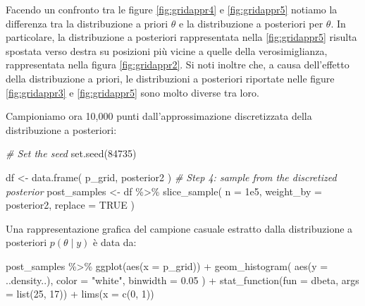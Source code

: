 \documentclass[
]{memoir}
\newenvironment{Shaded}{\begin{snugshade}}{\end{snugshade}}
\newcommand{\AttributeTok}[1]{\textcolor[rgb]{0.77,0.63,0.00}{#1}}
\newcommand{\CommentTok}[1]{\textcolor[rgb]{0.56,0.35,0.01}{\textit{#1}}}
\newcommand{\ConstantTok}[1]{\textcolor[rgb]{0.00,0.00,0.00}{#1}}
\newcommand{\DecValTok}[1]{\textcolor[rgb]{0.00,0.00,0.81}{#1}}
\newcommand{\FloatTok}[1]{\textcolor[rgb]{0.00,0.00,0.81}{#1}}
\newcommand{\FunctionTok}[1]{\textcolor[rgb]{0.00,0.00,0.00}{#1}}
\newcommand{\NormalTok}[1]{#1}
\newcommand{\OtherTok}[1]{\textcolor[rgb]{0.56,0.35,0.01}{#1}}
\newcommand{\SpecialCharTok}[1]{\textcolor[rgb]{0.00,0.00,0.00}{#1}}
\newcommand{\StringTok}[1]{\textcolor[rgb]{0.31,0.60,0.02}{#1}}
\begin{document}
Facendo un confronto tra le figure \ref{fig:gridappr4} e \ref{fig:gridappr5} notiamo la differenza tra la distribuzione a priori \(\theta\) e la distribuzione a posteriori per \(\theta\). In particolare, la distribuzione a posteriori rappresentata nella \ref{fig:gridappr5} risulta spostata verso destra su posizioni più vicine a quelle della verosimiglianza, rappresentata nella figura \ref{fig:gridappr2}. Si noti inoltre che, a causa dell'effetto della distribuzione a priori, le distribuzioni a posteriori riportate nelle figure \ref{fig:gridappr3} e \ref{fig:gridappr5} sono molto diverse tra loro.

Campioniamo ora 10,000 punti dall'approssimazione discretizzata della distribuzione a posteriori:

\begin{Shaded}
\begin{Highlighting}[]
\CommentTok{\# Set the seed}
\FunctionTok{set.seed}\NormalTok{(}\DecValTok{84735}\NormalTok{)}

\NormalTok{df }\OtherTok{\textless{}{-}} \FunctionTok{data.frame}\NormalTok{(}
\NormalTok{  p\_grid,}
\NormalTok{  posterior2}
\NormalTok{)}
\CommentTok{\# Step 4: sample from the discretized posterior}
\NormalTok{post\_samples }\OtherTok{\textless{}{-}}\NormalTok{ df }\SpecialCharTok{\%\textgreater{}\%}
  \FunctionTok{slice\_sample}\NormalTok{(}
  \AttributeTok{n =} \FloatTok{1e5}\NormalTok{,}
  \AttributeTok{weight\_by =}\NormalTok{ posterior2,}
  \AttributeTok{replace =} \ConstantTok{TRUE}
\NormalTok{)}
\end{Highlighting}
\end{Shaded}

\noindent
Una rappresentazione grafica del campione casuale estratto dalla distribuzione a posteriori \(p(\theta \mid y)\) è data da:

\begin{Shaded}
\begin{Highlighting}[]
\NormalTok{post\_samples }\SpecialCharTok{\%\textgreater{}\%}
  \FunctionTok{ggplot}\NormalTok{(}\FunctionTok{aes}\NormalTok{(}\AttributeTok{x =}\NormalTok{ p\_grid)) }\SpecialCharTok{+}
  \FunctionTok{geom\_histogram}\NormalTok{(}
    \FunctionTok{aes}\NormalTok{(}\AttributeTok{y =}\NormalTok{ ..density..), }
    \AttributeTok{color =} \StringTok{"white"}\NormalTok{, }
    \AttributeTok{binwidth =} \FloatTok{0.05}
\NormalTok{  ) }\SpecialCharTok{+}
  \FunctionTok{stat\_function}\NormalTok{(}\AttributeTok{fun =}\NormalTok{ dbeta, }\AttributeTok{args =} \FunctionTok{list}\NormalTok{(}\DecValTok{25}\NormalTok{, }\DecValTok{17}\NormalTok{)) }\SpecialCharTok{+}
  \FunctionTok{lims}\NormalTok{(}\AttributeTok{x =} \FunctionTok{c}\NormalTok{(}\DecValTok{0}\NormalTok{, }\DecValTok{1}\NormalTok{))}
\end{Highlighting}
\end{Shaded}
\end{document}
